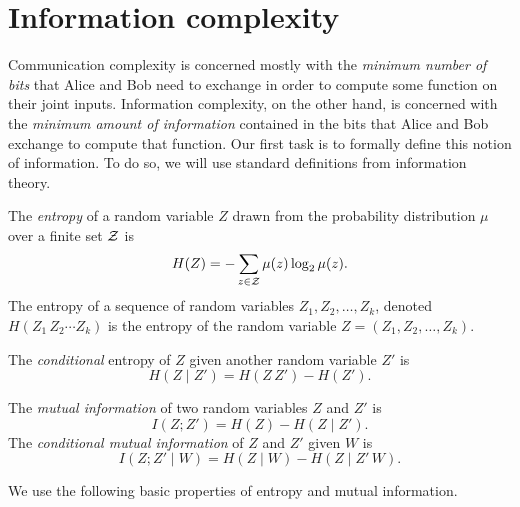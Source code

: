 \chapter[CH05]{Information complexity}

Communication complexity is concerned mostly with the \emph{minimum number of bits} that Alice and Bob need to exchange in order to compute some function on
their joint inputs. Information complexity, on the other hand, is concerned with
the \emph{minimum amount of information} contained in the bits that Alice and
Bob exchange to compute that function. Our first task is to formally define this notion of information. To do so, we will use standard definitions from information theory.
\newpage
\begin{definition}[Entropy]
	The \emph{entropy} of a random variable $Z$ drawn from the probability distribution $\mu$ over a finite set $\mathcal{Z}$ is
	\[
	H(Z) = - \sum_{z \in \mathcal{Z}} \mu(z) \log_2 \mu(z).
	\]
	The entropy of a sequence of random variables $Z_1,Z_2,\ldots,Z_k$, denoted $H(Z_1\,Z_2\cdots Z_k)$ is the entropy of the random variable $Z = (Z_1,Z_2,\ldots,Z_k)$.
\end{definition}

\begin{definition}
	The \emph{conditional} entropy of $Z$ given another random variable $Z'$ is
	\[
	H(Z \mid Z') = H(Z\,Z') - H(Z').
	\]
\end{definition}

\begin{definition}
	The \emph{mutual information} of two random variables $Z$ and $Z'$ is
	\[
	I( Z ; Z' ) = H(Z) - H(Z \mid Z').
	\]
	The \emph{conditional mutual information} of $Z$ and $Z'$ given $W$ is
	\[
	I( Z ; Z' \mid W) = H(Z \mid W) - H(Z \mid Z'\, W).
	\]
\end{definition}

We use the following basic properties of entropy and mutual information.

